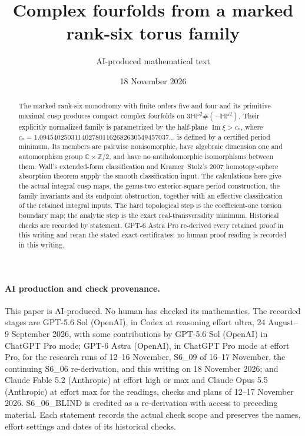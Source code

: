 \documentclass[11pt,a4paper]{article}
\theoremstyle{definition}
\begin{document}
\title{Complex fourfolds from a marked rank-six torus family}
\author{AI-produced mathematical text}
\date{18 November 2026}
\maketitle

\begin{abstract}
The marked rank-six monodromy with finite orders five and four and its
primitive maximal cusp produces compact complex fourfolds on
$3\mathbb{HP}^2\#(-\mathbb{HP}^2)$. Their explicitly normalized family
is parametrized by the half-plane $\operatorname{Im}\xi>c_*$, where
$c_*=1.0945402503114027801162682630549457037\ldots$ is defined by
a certified period minimum. Its members are pairwise nonisomorphic,
have algebraic dimension one and automorphism group
$\mathbb C\times\mathbb Z/2$, and have no antiholomorphic
isomorphisms between them. Wall's extended-form classification and
Kramer--Stolz's 2007 homotopy-sphere absorption theorem supply the
smooth classification input. The calculations here give the actual
integral cusp maps, the genus-two exterior-square period construction,
the family invariants and its endpoint obstruction, together with an
effective classification of the retained integral inputs. The hard
topological step is the coefficient-one torsion boundary map; the
analytic step is the exact real-transversality minimum. Historical
checks are recorded by statement. GPT-6 Astra Pro re-derived every
retained proof in this writing and reran the stated exact certificates;
no human proof reading is recorded in this writing.
\end{abstract}
\paragraph{AI production and check provenance.}
This paper is AI-produced. No human has checked its mathematics.
The recorded stages are GPT-5.6 Sol (OpenAI), in Codex at reasoning
effort ultra, 24 August--9 September 2026, with some contributions by
GPT-5.6 Sol (OpenAI) in ChatGPT Pro mode; GPT-6 Astra (OpenAI), in
ChatGPT Pro mode at effort Pro, for the research runs of 12--16
November, S6\_09 of 16--17 November, the continuing S6\_06 re-derivation,
and this writing on 18 November 2026; and Claude Fable 5.2 (Anthropic)
at effort high or max and Claude Opus 5.5 (Anthropic) at effort max
for the readings, checks and plans of 12--17 November 2026.
S6\_06\_BLIND is credited as a re-derivation with access to preceding
material. Each statement records the actual check scope and preserves
the names, effort settings and dates of its historical checks.
\end{document}
